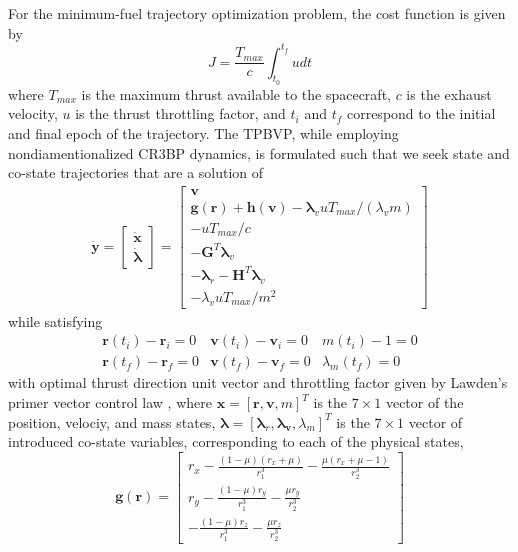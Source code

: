 \documentclass[letterpaper, paper,11pt]{AAS}		%
\begin{document}
For the minimum-fuel trajectory optimization problem, the cost function is given by
\begin{equation}
	J = \frac{T_{max}}{c}\int_{t_0}^{t_f}udt
\end{equation}
where $T_{max}$ is the maximum thrust available to the spacecraft, $c$ is the exhaust velocity, $u$ is the thrust throttling factor, and $t_i$ and $t_f$ correspond to the initial and final epoch of the trajectory. The TPBVP, while employing nondiamentionalized CR3BP dynamics, is formulated such that we seek state and co-state trajectories that are a solution of
\begin{align}
	\Dot{\mathbf{y}} = \begin{bmatrix} \Dot{\mathbf{x}} \\ 
	\Dot{\boldsymbol{\lambda}} \end{bmatrix} = \begin{bmatrix} \mathbf{v} \\ 
	\mathbf{g}(\mathbf{r}) + \mathbf{h}(\mathbf{v}) - \boldsymbol{\lambda}_vuT_{max}/(\lambda_vm) \\ 
	-uT_{max}/c \\ 
	-\mathbf{G}^T\boldsymbol{\lambda}_v \\ 
	-\boldsymbol{\lambda}_r - \mathbf{H}^T\boldsymbol{\lambda}_v \\ 
	-\lambda_vuT_{max}/m^2
	\end{bmatrix}
	\label{eqn:full_ode}
\end{align}
while satisfying 
\begin{equation}
	\begin{array}{ccc}
		\mathbf{r}(t_i) - \mathbf{r}_i = 0 & \mathbf{v}(t_i) - \mathbf{v}_i = 0 & m(t_i) - 1 = 0 \\
		\mathbf{r}(t_f) - \mathbf{r}_f = 0 & \mathbf{v}(t_f) - \mathbf{v}_f = 0 & \lambda_m(t_f) = 0 
	\end{array}
\label{eqn:state_cons}
\end{equation}
with optimal thrust direction unit vector and throttling factor given by Lawden's primer vector control law \cite{Lawden_1964, Hecht_2021, Russell_2007}, where $\mathbf{x} = [\mathbf{r},\mathbf{v},m]^T$ is the $7\times1$ vector of the position, velociy, and mass states, $\boldsymbol{\lambda}=[\boldsymbol{\lambda}_r,\boldsymbol{\lambda_v},\lambda_m]^T$ is the $7\times1$ vector of introduced co-state variables, corresponding to each of the physical states,
\begin{equation}
	\mathbf{g}(\mathbf{r}) = \begin{bmatrix}
	r_x - \frac{(1 - \mu)(r_x + \mu)}{r_1^3} - \frac{\mu(r_x + \mu - 1)}{r_2^3} \\
	r_y - \frac{(1 - \mu)r_y}{r_1^3} - \frac{\mu r_y}{r_2^3} \\
	-\frac{(1 - \mu)r_z}{r_1^3} - \frac{\mu r_z}{r_2^3}
	\end{bmatrix}
\end{equation}
\end{document}
